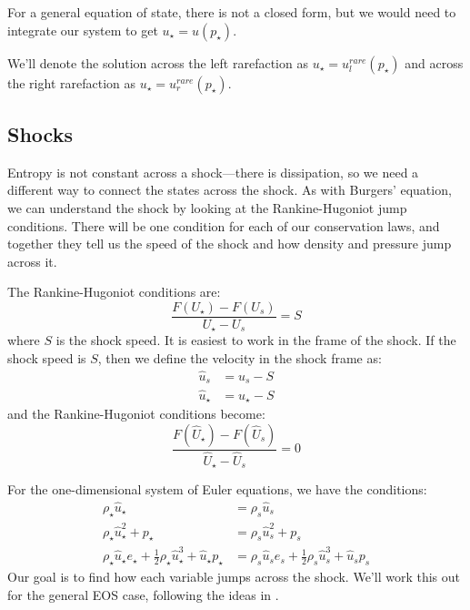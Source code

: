 For a general equation of state, there is not a closed form, but we would need
to integrate our system to get $u_\star = u(p_\star)$.

We'll denote the solution across the left rarefaction as $u_\star =
u_l^{rare}(p_\star)$ and across the right rarefaction as $u_\star =
u_r^{rare}(p_\star)$.

\subsection{Shocks}

Entropy is not constant across a shock---there is dissipation, so we
need a different way to connect the states across the shock.  As with
Burgers' equation, we can understand the shock by looking at the
Rankine-Hugoniot jump conditions.  There will be one condition for
each of our conservation laws, and together they tell us the speed of
the shock and how density and pressure jump across
it.  

The Rankine-Hugoniot conditions are:
\begin{equation}
\frac{F(U_\star) - F(U_s)}{U_\star - U_s} = S
\end{equation}
where $S$ is the shock speed.  It is easiest to work in the frame of the shock.  If the shock speed
is $S$, then we define the velocity in the shock frame as:
\begin{align}
\hat{u}_s &= u_s - S  \\
\hat{u}_\star &= u_\star - S
\end{align}
and the Rankine-Hugoniot conditions become:
\begin{equation}
\frac{F(\hat{U}_\star) - F(\hat{U}_s)}{\hat{U}_\star - \hat{U}_s} = 0
\end{equation}

For the one-dimensional system of Euler equations, we have the conditions:
\begin{align}
\rho_\star \hat{u}_\star &= \rho_s \hat{u}_s \\
\rho_\star \hat{u}_\star^2 + p_\star &= \rho_s \hat{u}_s^2 + p_s \\
\rho_\star \hat{u}_\star e_\star + \frac{1}{2} \rho_\star \hat{u}_\star^3 + \hat{u}_\star p_\star &= 
  \rho_s \hat{u}_s e_s + \frac{1}{2} \rho_s \hat{u}_s^3 + \hat{u}_s p_s
\end{align}
Our goal is to find how each variable jumps across the shock.  We'll 
work this out for the general EOS case, following the ideas in \cite{colellaglaz:1985}.

